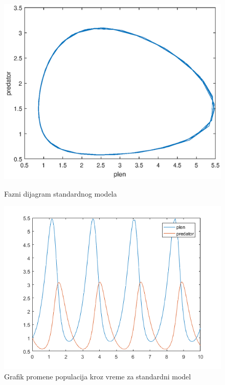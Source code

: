 \documentclass[a4paper]{article}
\begin{document}
\begin{figure}[H]
    \centering
    \begin{minipage}{0.45\textwidth}
        \centering
        \includegraphics[width=1\textwidth]{images/lotka_voltera_phase} %
        \caption{Fazni dijagram standardnog modela}
    \end{minipage}\hfill
    \begin{minipage}{0.45\textwidth}
        \centering
        \includegraphics[width=1\textwidth]{images/lotka_voltera_time_plot} %
        \caption{Grafik promene populacija kroz vreme za standardni model}
    \end{minipage}
\end{figure}
\end{document}
